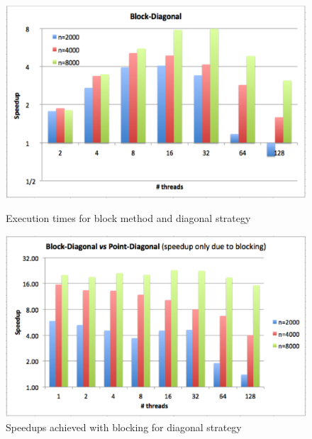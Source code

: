\documentclass[../thesis]{subfiles}
\begin{document}
	\begin{figure}[p]
		\begin{minipage}[t]{0.47\textwidth}
			\centering
			\includegraphics[width=\textwidth]{assets/images/multicore/block-diagonal.png}
			\caption{Execution times for block method and diagonal strategy}
			\label{fig:multicore:block:diagonal:speedup}
		\end{minipage}
		\hfill
		\begin{minipage}[t]{0.48\textwidth}
			\centering
			\includegraphics[width=\textwidth]{assets/images/multicore/diagonal-speedup.png}
			\caption{Speedups achieved with blocking for diagonal strategy}
			\label{fig:multicore:block:diagonal:speedup}
		\end{minipage}
	\end{figure}
\end{document}
